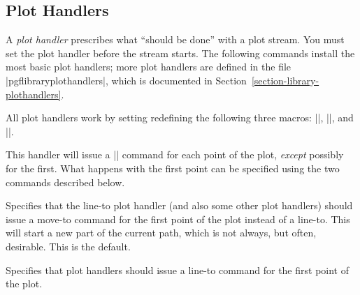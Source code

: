 \subsection{Plot Handlers}

\label{section-plot-handlers}

A \emph{plot handler}  prescribes what ``should be done'' with a
plot stream. You must set the plot handler before the stream starts.
The following commands install the most basic plot handlers; more plot
handlers are defined in the file |pgflibraryplothandlers|, which is
documented in Section~\ref{section-library-plothandlers}.

All plot handlers work by setting redefining the following three
macros: |\pgf@plotstreamstart|, |\pgf@plotstreampoint|, and
|\pgf@plotstreamend|.

\begin{command}{\pgfplothandlerlineto}
  This handler will issue a |\pgfpathlineto| command for each point of
  the plot, \emph{except} possibly for the first. What happens with
  the first point can be specified using the two commands described
  below.

\begin{codeexample}[]
\begin{pgfpicture}
  \pgfpathmoveto{\pgfpointorigin}
  \pgfplothandlerlineto
  \pgfplotstreamstart
  \pgfplotstreampoint{\pgfpoint{1cm}{0cm}}
  \pgfplotstreampoint{\pgfpoint{2cm}{1cm}}
  \pgfplotstreampoint{\pgfpoint{3cm}{2cm}}
  \pgfplotstreampoint{\pgfpoint{1cm}{2cm}}
  \pgfplotstreamend
\end{pgfpicture}
\end{codeexample}
\end{command}

\begin{command}{\pgfsetmovetofirstplotpoint}
  Specifies that the line-to plot handler (and also some other plot
  handlers) should issue a move-to command for the
  first point of the plot instead of a line-to. This will start a new
  part of the current path, which is not always, but often,
  desirable. This is the default.
\end{command}

\begin{command}{\pgfsetlinetofirstplotpoint}
  Specifies that  plot handlers should issue a line-to command for the
  first point of the plot.

\begin{codeexample}[]
\begin{pgfpicture}
  \pgfpathmoveto{\pgfpointorigin}
  \pgfsetlinetofirstplotpoint
  \pgfplothandlerlineto
  \pgfplotstreamstart
  \pgfplotstreampoint{\pgfpoint{1cm}{0cm}}
  \pgfplotstreampoint{\pgfpoint{2cm}{1cm}}
  \pgfplotstreampoint{\pgfpoint{3cm}{2cm}}
  \pgfplotstreampoint{\pgfpoint{1cm}{2cm}}
  \pgfplotstreamend
\end{pgfpicture}
\end{codeexample}
\end{command}

